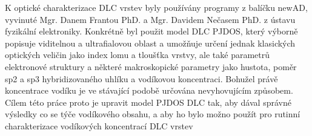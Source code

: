 K optické charakterizace DLC vrstev byly používány programy z balíčku newAD, vyvinuté Mgr. Danem Frantou PhD. a Mgr. Davidem Nečasem PhD. z ústavu fyzikální elektroniky. Konkrétně byl použit model DLC PJDOS, který výborně popisuje viditelnou a ultrafialovou oblast a umožňuje určení jednak klasických optických veličin jako index lomu a tloušťka vrstvy, ale také parametrů elektronové struktury a některé makroskopické parametry jako hustota, poměr sp2 a sp3 hybridizovaného uhlíku a vodíkovou koncentraci. 
Bohužel právě koncentrace vodíku je ve stávající podobě určována nevyhovujícím způsobem. Cílem této práce proto je upravit model PJDOS DLC tak, aby dával správné výsledky co se týče vodíkového obsahu, a aby ho bylo možno použít pro rutinní charakterizace vodíkových koncentrací DLC vrstev
 
\cleardoublepage

